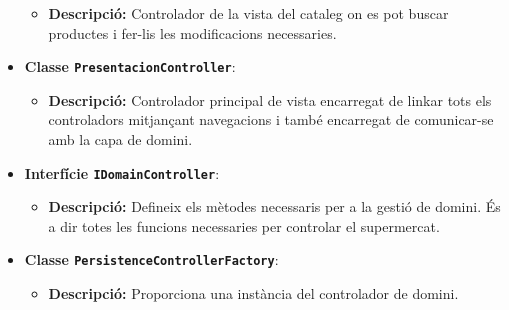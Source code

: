 \documentclass[a4paper,12pt]{report}
\begin{document}
\begin{itemize}
	\begin{itemize}
		\item \textbf{Descripció:} Controlador de la vista del cataleg on es pot buscar productes i fer-lis les modificacions necessaries.
	\end{itemize}
	\item \textbf{Classe \texttt{PresentacionController}}:
	\begin{itemize}
		\item \textbf{Descripció:} Controlador principal de vista encarregat de linkar tots els controladors mitjançant navegacions i també encarregat de comunicar-se amb la capa de domini.
	\end{itemize}
	\item \textbf{Interfície \texttt{IDomainController}}:
	\begin{itemize}
		\item \textbf{Descripció:} Defineix els mètodes necessaris per a la gestió de domini. És a dir totes les funcions necessaries per controlar el supermercat.
	\end{itemize}
	\item \textbf{Classe \texttt{PersistenceControllerFactory}}:
	\begin{itemize}
		\item \textbf{Descripció:} Proporciona una instància del controlador de domini.
	\end{itemize}


\end{itemize}
\end{document}
